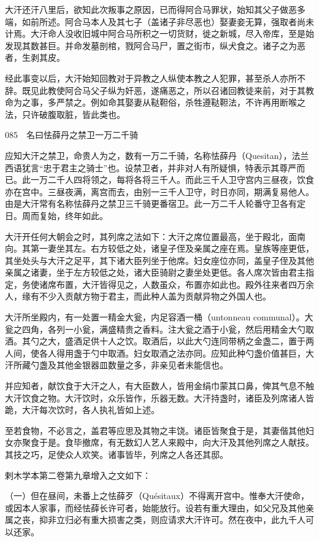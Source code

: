 \documentclass[12pt,UTF8]{ctexbook}
\begin{document}
大汗还汗八里后，欲知此次叛事之原因，已而得阿合马罪状，始知其父子做恶多端，如前所述。阿合马本人及其七子（盖诸子非尽恶也）娶妻妾无算，强取者尚未计焉。大汗命人没收旧城中阿合马所积之一切货财，徙之新城，尽入帝库，至是始发现其数甚巨。并命发墓剖棺，戮阿合马尸，置之街市，纵犬食之。诸子之为恶者，生剥其皮。

经此事变以后，大汗始知回教对于异教之人纵使本教之人犯罪，甚至杀人亦所不辞。既见此教使阿合马父子纵为奸恶，遂痛恶之，所以召诸回教徒来前，对于其教命为之事，多严禁之。例如命其娶妻从鞑靼俗，杀牲遵鞑靼法，不许再用断喉之法，只许破腹取脏，皆此类也。





085　名曰怯薛丹之禁卫一万二千骑

应知大汗之禁卫，命贵人为之，数有一万二千骑，名称怯薛丹（Quesitan），法兰西语犹言“忠于君主之骑士”也。设禁卫者，并非对人有所疑惧，特表示其尊严而已。此一万二千人四将领之，每将各将三千人。而此三千人卫守宫内三昼夜，饮食亦在宫中。三昼夜满，离宫而去，由别一三千人卫守，时日亦同，期满复易他人。由是大汗常有名称怯薛丹之禁卫三千骑更番宿卫。此一万二千人轮番守卫各有定日。周而复始，终年如此。

大汗开任何大朝会之时，其列席之法如下：大汗之席位置最高，坐于殿北，面南向。其第一妻坐其左。右方较低之处，诸皇子侄及亲属之座在焉。皇族等座更低，其坐处头与大汗之足平，其下诸大臣列坐于他席。妇女座位亦同，盖皇子侄及其他亲属之诸妻，坐于左方较低之处，诸大臣骑尉之妻坐处更低。各人席次皆由君主指定，务使诸席布置，大汗皆得见之，人数虽众，布置亦如此也。殿外往来者四万余人，缘有不少入贡献方物于君主，而此种人盖为贡献异物之外国人也。

大汗所坐殿内，有一处置一精金大瓮，内足容酒一桶（untonneau communal）。大瓮之四角，各列一小瓮，满盛精贵之香料。注大瓮之酒于小瓮，然后用精金大勺取酒。其勺之大，盛酒足供十人之饮。取酒后，以此大勺连同带柄之金盏二，置于两人间，使各人得用盏于勺中取酒。妇女取酒之法亦同。应知此种勺盏价值甚巨，大汗所藏勺盏及其他金银器皿数量之多，非亲见者未能信也。

并应知者，献饮食于大汗之人，有大臣数人，皆用金绢巾蒙其口鼻，俾其气息不触大汗饮食之物。大汗饮时，众乐皆作，乐器无数。大汗持盏时，诸臣及列席诸人皆跪，大汗每次饮时，各人执礼皆如上述。

至若食物，不必言之，盖君等应思及其物之丰饶。诸臣皆聚食于是，其妻偕其他妇女亦聚食于是。食毕撤席，有无数幻人艺人来殿中，向大汗及其他列席之人献技。其技之巧，足使众人欢笑。诸事皆毕，列席之人各还其邸。

剌木学本第二卷第九章增入之文如下：

（一）但在昼间，未番上之怯薛歹（Quésitaux）不得离开宫中。惟奉大汗使命，或因本人家事，而经怯薛长许可者，始能放行。设若有重大理由，如父兄及其他亲属之丧，抑非立归必有重大损害之类，则应请求大汗许可。然在夜中，此九千人可以还家。
\end{document}
